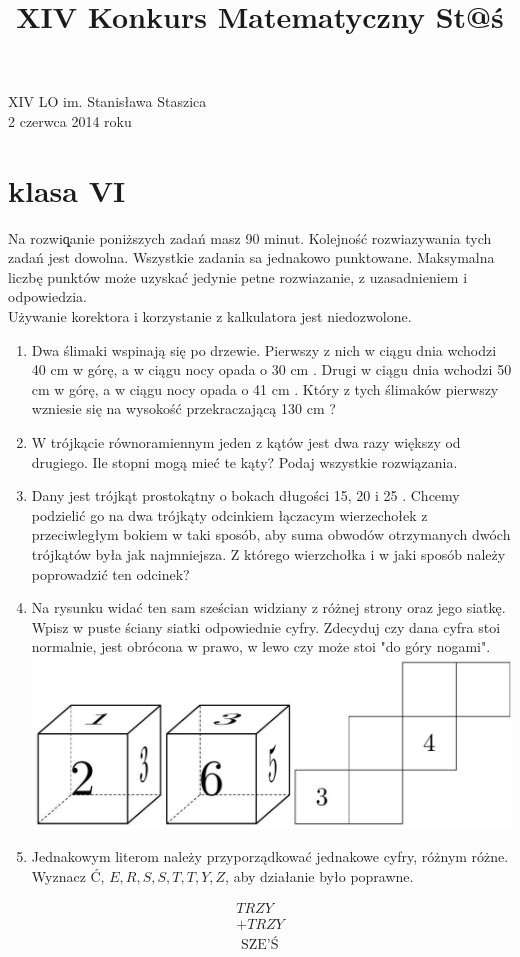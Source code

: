 \documentclass[10pt]{article}
\title{XIV Konkurs Matematyczny St@ś }
\author{}
\date{}
\begin{document}
\maketitle
XIV LO im. Stanisława Staszica\\
2 czerwca 2014 roku

\section*{klasa VI}
Na rozwiq̨anie poniższych zadań masz 90 minut. Kolejność rozwiazywania tych zadań jest dowolna. Wszystkie zadania sa jednakowo punktowane. Maksymalna liczbę punktów może uzyskać jedynie petne rozwiazanie, z uzasadnieniem i odpowiedzia.\\
Używanie korektora i korzystanie z kalkulatora jest niedozwolone.

\begin{enumerate}
  \item Dwa ślimaki wspinają się po drzewie. Pierwszy z nich w ciągu dnia wchodzi 40 cm w górę, a w ciągu nocy opada o 30 cm . Drugi w ciągu dnia wchodzi 50 cm w górę, a w ciągu nocy opada o 41 cm . Który z tych ślimaków pierwszy wzniesie się na wysokość przekraczającą 130 cm ?
  \item W trójkącie równoramiennym jeden z kątów jest dwa razy większy od drugiego. Ile stopni mogą mieć te kąty? Podaj wszystkie rozwiązania.
  \item Dany jest trójkąt prostokątny o bokach długości 15, 20 i 25 . Chcemy podzielić go na dwa trójkąty odcinkiem łączacym wierzechołek z przeciwległym bokiem w taki sposób, aby suma obwodów otrzymanych dwóch trójkątów była jak najmniejsza. Z którego wierzchołka i w jaki sposób należy poprowadzić ten odcinek?
  \item Na rysunku widać ten sam sześcian widziany z różnej strony oraz jego siatkę. Wpisz w puste ściany siatki odpowiednie cyfry. Zdecyduj czy dana cyfra stoi normalnie, jest obrócona w prawo, w lewo czy może stoi "do góry nogami".\\
\includegraphics[max width=\textwidth, center]{2024_11_21_0a02dd0dee09c5119b68g-1}
  \item Jednakowym literom należy przyporządkować jednakowe cyfry, różnym różne. Wyznacz Ć, \(E, R, S, S, T, T, Y, Z\), aby działanie było poprawne.
\end{enumerate}

\[
\begin{array}{r}
T R Z Y \\
+T R Z Y \\
\hline \text { SZE'Ś }
\end{array}
\]
\end{document}
